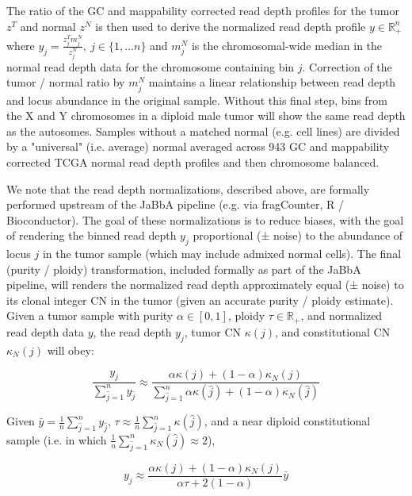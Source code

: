 \documentclass[phd,tocprelim]{cornell}
\begin{document}
The ratio of the GC and mappability corrected read depth profiles for the tumor $z^T$ and normal $z^N$ is then used to derive the normalized read depth profile $y \in \mathbb{R}^n_+$ where $y_j = \frac{z_j^Tm_j^N}{z_j^N},~j \in \{1, ... n\}$ and $m^N_j$ is the chromosomal-wide median in the normal read depth data for the chromosome containing bin $j$.  Correction of the tumor / normal ratio by $m^N_j$ maintains a linear relationship between read depth and locus abundance in the original sample. Without this final step, bins from the X and Y chromosomes in a diploid male tumor will show the same read depth as the autosomes.  Samples without a matched normal (e.g. cell lines) are divided by a "universal" (i.e. average) normal averaged across 943 GC and mappability corrected TCGA normal read depth profiles and then chromosome balanced.


We note that the read depth normalizations, described above, are formally performed upstream of the JaBbA pipeline (e.g. via fragCounter, R / Bioconductor). The goal of these normalizations is to reduce biases, with the goal of rendering the binned read depth $y_j$ proportional (± noise) to the abundance of locus $j$ in the tumor sample (which may include admixed normal cells).  The final (purity / ploidy) transformation, included formally as part of the JaBbA pipeline, will renders the normalized read depth approximately equal (± noise) to its clonal integer CN in the tumor (given an accurate purity / ploidy estimate). Given a tumor sample with purity $\alpha \in [0, 1]$, ploidy $\tau \in \mathbb{R}_+$, and normalized read depth data $y$, the read depth $y_j$, tumor CN $\kappa(j)$, and constitutional CN $\kappa_N(j)$ will obey:

\begin{equation} \label{eq:ppbins}
    \frac{y_j}{\sum_{\hat{j} = 1}^n y_{\hat{j}}} \approx \frac{\alpha \kappa(j) + (1-\alpha)\kappa_N(j)}{\sum_{\hat{j} = 1}^n \alpha \kappa(\hat{j}) + (1-\alpha)\kappa_N(\hat{j})}
\end{equation}

Given $\bar{y} = \frac{1}{n}\sum_{\hat{j} = 1}^{n} y_{\hat{j}}$, $\tau \approx \frac{1}{n}\sum_{\hat{j} = 1}^{n} \kappa(\hat{j})$, and a near diploid constitutional sample (i.e. in which $\frac{1}{n}\sum_{\hat{j} = 1}^{n} \kappa_N(\hat{j}) \approx 2$),

\begin{equation} \label{eq:ppbins2}
    y_j \approx \frac{\alpha\kappa(j) + (1-\alpha)\kappa_N(j)}{\alpha \tau + 2(1-\alpha)} \bar{y}
\end{equation}
\end{document}
